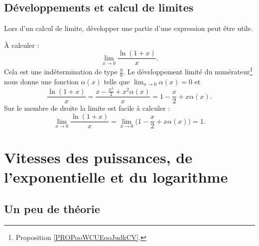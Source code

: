 \subsection{Développements et calcul de limites}

Lors d'un calcul de limite, développer une partie d'une expression peut être utile.

\begin{example}
    À calculer :
    \begin{equation}
        \lim_{x\to 0} \frac{ \ln(1+x) }{ x }.
    \end{equation}
    Cela est une indétermination de type \( \frac{ 0 }{ 0 }\). Le développement limité du numérateur\footnote{Proposition \ref{PROPooWCUEooJudkCV}.} nous donne une fonction \( \alpha(x)\) telle que \( \lim_{x\to 0} \alpha(x)=0\) et
    \begin{equation}
        \frac{ \ln(1+x) }{ x }=\frac{ x-\frac{ x^2 }{2}+x^2\alpha(x) }{ x }=1-\frac{ x }{ 2 }+x\alpha(x).
    \end{equation}
    Sur le membre de droite la limite est facile à calculer :
    \begin{equation}
        \lim_{x\to 0} \frac{ \ln(1+x) }{ x }=\lim_{x\to 0} \Big( 1-\frac{ x }{ 2 }+x\alpha(x) \Big) =1.
    \end{equation}
\end{example}

\section{Vitesses des puissances, de l'exponentielle et du logarithme}

\subsection{Un peu de théorie}


